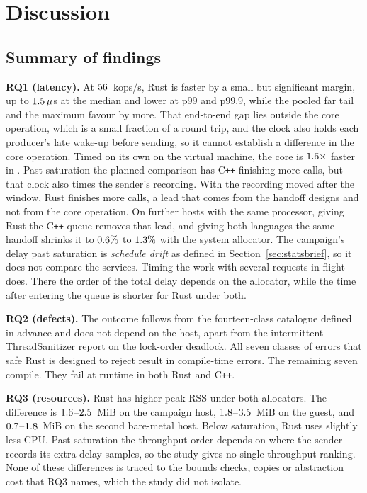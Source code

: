 \documentclass[english,oneside,a4paper,censored,csm,software-track-2020]{HYthesisML}
\begin{document}
\chapter{Discussion\label{chapter:discussion}}

\section{Summary of findings}
\begin{compactitem}
\item \textbf{RQ1 (latency).} At $56$~kops/s, Rust is faster by a small but
significant margin, up to $1.5\,\mu$s at the median and lower at p99 and p99.9,
while the pooled far tail and the maximum favour \FarTailLower{} by more. That end-to-end gap
lies outside the core operation, which is a small fraction of a round trip, and the clock
also holds each producer's late wake-up before sending, so it cannot establish a difference in
the core operation. Timed on its own on the virtual machine, the core
is $1.6\times$ faster in \BudgetCoreFaster{}. Past saturation the planned
comparison has C\texttt{++} finishing more calls, but that clock also times the sender's
recording. With the recording moved after the window, Rust finishes more calls, a lead that
comes from the handoff designs and not from the core operation. On further hosts with the
same processor, giving Rust the C\texttt{++} queue removes that lead, and giving both
languages the same handoff shrinks it to $0.6\%$ to $1.3\%$ with
the system allocator.
The campaign's delay past saturation is \emph{schedule drift} as defined in
Section~\ref{sec:statsbrief}, so it does not compare the services. Timing the work with
several requests in flight does. There the order of the total delay depends on the allocator,
while the time after entering the queue is shorter for Rust under both.

\item \textbf{RQ2 (defects).} The outcome follows from the fourteen-class catalogue defined
in advance and does not depend on the host, apart from the intermittent ThreadSanitizer
report on the lock-order deadlock. All seven classes of errors that safe Rust is
designed to reject result in compile-time errors. The remaining seven compile. They fail at
runtime in both Rust and C\texttt{++}.

\item \textbf{RQ3 (resources).} Rust has higher peak RSS under both allocators. The difference is
$1.6$--$2.5$~MiB on the campaign host, $1.8$--$3.5$~MiB
on the guest, and $0.7$--$1.8$~MiB on the second bare-metal host. Below
saturation, Rust uses slightly less CPU. Past saturation the throughput order depends on
where the sender records its extra delay samples, so the study gives no single throughput
ranking. None of these differences is traced to the bounds checks, copies or abstraction
cost that RQ3 names, which the study did not isolate.


\end{compactitem}
\end{document}

